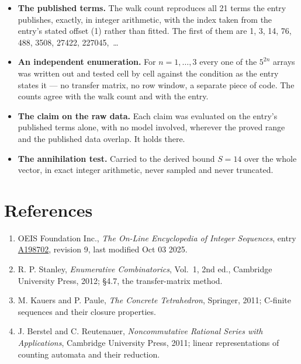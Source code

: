 \documentclass[11pt]{article}
\theoremstyle{definition}
\begin{document}
\begin{itemize}

\item {\bfseries The published terms.} The walk count reproduces all 21 terms the entry publishes, exactly, in integer arithmetic, with the index taken from the entry's stated offset (1) rather than fitted. The first of them are 1, 3, 14, 76, 488, 3508, 27422, 227045,~\dots

\item {\bfseries An independent enumeration.} For $n = 1,\dots,3$ every one of the $5^{2n}$ arrays was written out and tested cell by cell against the condition as the entry states it --- no transfer matrix, no row window, a separate piece of code. The counts agree with the walk count and with the entry.

\item {\bfseries The claim on the raw data.} Each claim was evaluated on the entry's published terms alone, with no model involved, wherever the proved range and the published data overlap. It holds there.

\item {\bfseries The annihilation test.} Carried to the derived bound $S = 14$ over the whole vector, in exact integer arithmetic, never sampled and never truncated.

\end{itemize}

\section{References}

\begin{enumerate}

\item OEIS Foundation Inc., \emph{The On-Line Encyclopedia of Integer Sequences}, entry \href{https://oeis.org/A198702}{A198702}, revision 9, last modified Oct 03 2025.

\item R. P. Stanley, \emph{Enumerative Combinatorics}, Vol.~1, 2nd ed., Cambridge University Press, 2012; \S4.7, the transfer-matrix method.

\item M. Kauers and P. Paule, \emph{The Concrete Tetrahedron}, Springer, 2011; C-finite sequences and their closure properties.

\item J. Berstel and C. Reutenauer, \emph{Noncommutative Rational Series with Applications}, Cambridge University Press, 2011; linear representations of counting automata and their reduction.

\end{enumerate}
\end{document}
